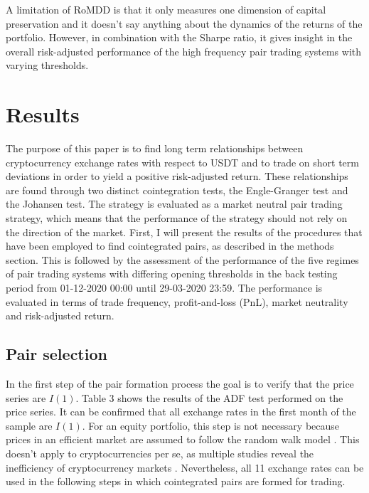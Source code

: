 \documentclass[12pt,english,authoryear]{article}
\begin{document}
A limitation of RoMDD is that it only measures one dimension of capital preservation and it doesn't say anything about the dynamics of the returns of the portfolio. However, in combination with the Sharpe ratio, it gives insight in the overall risk-adjusted performance of the high frequency pair trading systems with varying thresholds.

\section{Results} \label{sec:Results}

The purpose of this paper is to find long term relationships between cryptocurrency exchange rates with respect to USDT and to trade on short term deviations in order to yield a positive risk-adjusted return. These relationships are found through two distinct cointegration tests, the Engle-Granger test and the Johansen test. The strategy is evaluated as a market neutral pair trading strategy, which means that the performance of the strategy should not rely on the direction of the market. First, I will present the results of the procedures that have been employed to find cointegrated pairs, as described in the methods section. This is followed by the assessment of the performance of the five regimes of pair trading systems with differing opening thresholds in the back testing period from 01-12-2020 00:00 until 29-03-2020 23:59. The performance is evaluated in terms of trade frequency, profit-and-loss (PnL), market neutrality and risk-adjusted return. 

\subsection{Pair selection}

In the first step of the pair formation process the goal is to verify that the price series are $I(1)$. Table 3 shows the results of the ADF test performed on the price series. It can be confirmed that all exchange rates in the first month of the sample are $I(1)$. For an equity portfolio, this step is not necessary because prices in an efficient market are assumed to follow the random walk model \cite{Fama_1995}. This doesn't apply to cryptocurrencies per se, as multiple studies reveal the inefficiency of cryptocurrency markets \cite{Urquhart_2016, Aggarwal_2019}. Nevertheless, all 11 exchange rates can be used in the following steps in which cointegrated pairs are formed for trading. 
\end{document}
